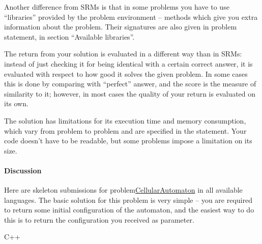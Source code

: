 Another difference from SRMs is that in some problems you have to use
``libraries'' provided by the problem environment -- methods which give
you extra information about the problem. Their signatures are also given
in problem statement, in section ``Available libraries''.

The return from your solution is evaluated in a different way than in
SRMs: instead of just checking it for being identical with a certain
correct answer, it is evaluated with respect to how good it solves the
given problem. In some cases this is done by comparing with ``perfect''
answer, and the score is the measure of similarity to it; however, in
most cases the quality of your return is evaluated on its own.

The solution has limitations for its execution time and memory
consumption, which vary from problem to problem and are specified in the
statement. Your code doesn't have to be readable, but some problems
impose a limitation on its size.

\hypertarget{discussion-2}{%
\paragraph{Discussion}\label{discussion-2}}

Here are skeleton submissions for
problem\href{http://community.topcoder.com/longcontest/?module=ViewProblemStatement\&rd=14273\&pm=10989}{CellularAutomaton}
in all available languages. The basic solution for this problem is very
simple -- you are required to return some initial configuration of the
automaton, and the easiest way to do this is to return the configuration
you received as parameter.

C++

\begin{Shaded}
\begin{Highlighting}[]


 

\NormalTok{:}

\NormalTok{   \}}
\NormalTok{\};}
\end{Highlighting}
\end{Shaded}


